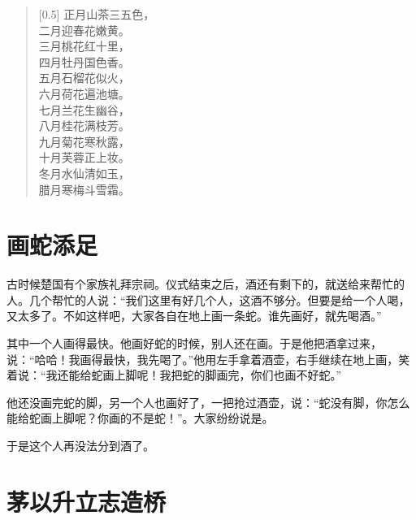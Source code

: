 \documentclass[12pt,UTF-8,openany]{ctexbook}
\begin{document}
\begin{Large}
    
    \begin{verse}[0.5\linewidth]
        正月山茶三五色， \\
        二月迎春花嫩黄。 \\
        三月桃花红十里， \\
        四月牡丹国色香。 \\
        五月石榴花似火， \\
        六月荷花遍池塘。 \\
        七月兰花生幽谷， \\
        八月桂花满枝芳。 \\
        九月菊花寒秋露， \\
        十月芙蓉正上妆。 \\
        冬月水仙清如玉， \\
        腊月寒梅斗雪霜。
    \end{verse}
    
\end{Large}

\chapter{画蛇添足}

\begin{Large}
    
    古时候楚国有个家族礼拜宗祠。仪式结束之后，酒还有剩下的，就送给来帮忙的人。几个帮忙的人说：“我们这里有好几个人，这酒不够分。但要是给一个人喝，又太多了。不如这样吧，大家各自在地上画一条蛇。谁先画好，就先喝酒。”
    
    其中一个人画得最快。他画好蛇的时候，别人还在画。于是他把酒拿过来，说：“哈哈！我画得最快，我先喝了。”他用左手拿着酒壶，右手继续在地上画，笑着说：“我还能给蛇画上脚呢！我把蛇的脚画完，你们也画不好蛇。”
    
    他还没画完蛇的脚，另一个人也画好了，一把抢过酒壶，说：“蛇没有脚，你怎么能给蛇画上脚呢？你画的不是蛇！”。大家纷纷说是。
    
    于是这个人再没法分到酒了。
    
\end{Large}

\chapter{茅以升立志造桥}
\end{document}
